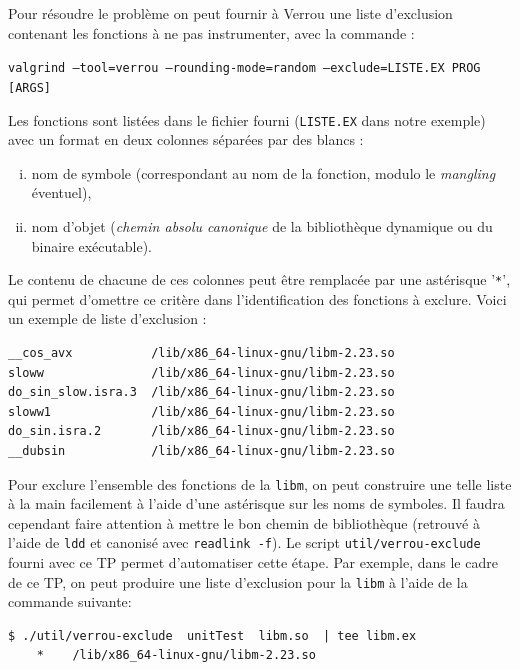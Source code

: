 \documentclass[a4paper]{article}
\newenvironment{commandline}{
  \begin{mdframed}[style=commandline]
}{
  \end{mdframed}
}
\def\mdfilename{File}
\newenvironment{file}[1][Fichier]{
  \def\mdfilename{#1}
  \begin{mdframed}[style=file]
}{
  \end{mdframed}
}
\begin{document}
Pour résoudre le problème on peut fournir à Verrou une liste d'exclusion contenant les fonctions à ne pas
instrumenter, avec la commande :

\strut\qquad\texttt{valgrind --tool=verrou --rounding-mode=random
  --exclude=LISTE.EX PROG [ARGS]}

\medskip

\noindent Les fonctions sont listées dans le fichier fourni (\texttt{LISTE.EX}
dans notre exemple) avec un format en deux colonnes séparées par des blancs :
\begin{enumerate}[(i)]
\item nom de symbole (correspondant au nom de la fonction, modulo le
  \textit{mangling} éventuel),
\item nom d'objet (\emph{chemin absolu canonique} de la bibliothèque dynamique ou du
  binaire exécutable).
\end{enumerate}
Le contenu de chacune de ces colonnes peut être remplacée par une astérisque
'\texttt{*}', qui permet d'omettre ce critère dans l'identification des
fonctions à exclure. Voici un exemple de liste d'exclusion :
%
\begin{file}[libm.ex]
\begin{verbatim}
__cos_avx           /lib/x86_64-linux-gnu/libm-2.23.so
sloww               /lib/x86_64-linux-gnu/libm-2.23.so
do_sin_slow.isra.3  /lib/x86_64-linux-gnu/libm-2.23.so
sloww1              /lib/x86_64-linux-gnu/libm-2.23.so
do_sin.isra.2       /lib/x86_64-linux-gnu/libm-2.23.so
__dubsin            /lib/x86_64-linux-gnu/libm-2.23.so
\end{verbatim}
\end{file}

Pour exclure l'ensemble des fonctions de la \texttt{libm}, on peut construire
une telle liste à la main facilement à l'aide d'une astérisque sur les noms de
symboles. Il faudra cependant faire attention à mettre le bon chemin de
bibliothèque (retrouvé à l'aide de \texttt{ldd} et canonisé avec
\texttt{readlink -f}). Le script \texttt{util/verrou-exclude} fourni avec ce TP
permet d'automatiser cette étape. Par exemple, dans le cadre de ce TP, on peut
produire une liste d'exclusion pour la \texttt{libm} à l'aide de la commande
suivante:
\begin{commandline}
\begin{verbatim}
$ ./util/verrou-exclude  unitTest  libm.so  | tee libm.ex
    *    /lib/x86_64-linux-gnu/libm-2.23.so
\end{verbatim}
\end{commandline}
\end{document}
